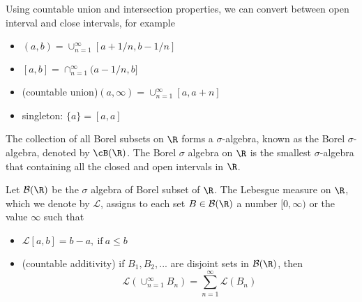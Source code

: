 \begin{refsection}
\begin{definition}
\begin{itemize}
\end{itemize}	
\end{definition}

\begin{note}
	Using countable union and intersection properties, we can convert between open interval and close intervals, for example
	\begin{itemize}
		\item $(a,b)=\cup_{n=1}^{\infty}[a+1/n,b-1/n]$
		\item $[a,b]=\cap_{n=1}^{\infty}(a-1/n,b]$
		\item (countable union)$(a,\infty) = \cup_{n=1}^{\infty}[a,a+n]$
		\item singleton: $\{a\} = [a,a]$
	\end{itemize}	
\end{note}

\begin{definition}
The collection of all Borel subsets on $\R$ forms a $\sigma$-algebra, known as the Borel $\sigma$-algebra, denoted by $\cB(\R)$. The Borel $\sigma$ algebra on $\R$ is the smallest $\sigma$-algebra that containing all the closed and open intervals in $\R$.	
\end{definition}


\begin{definition}\cite[20]{shreve2004stochastic2}
Let $\mathcal{B}(\R)$ be the $\sigma$ algebra of Borel subset of $\R$. The Lebesgue measure on $\R$, which we denote by $\mathcal{L}$, assigns to each set $B\in \mathcal{B}(\R)$ a number $[0,\infty)$ or the value $\infty$ such that 
\begin{itemize}
    \item $\mathcal{L}[a,b]=b-a, ~ \text{if} ~ a\leq b$
    \item (countable additivity) if $B_1,B_2,...$ are disjoint sets in $\mathcal{B}(\R)$, then
    $$\mathcal{L}(\cup_{n=1}^\infty B_n) = \sum_{n=1}^\infty \mathcal{L}(B_n)$$
\end{itemize}
\end{definition}


\end{refsection}
